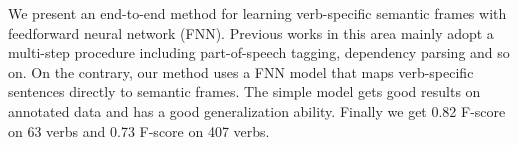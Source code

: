 We present an end-to-end method for learning verb-specific semantic frames with feedforward neural network (FNN). Previous works in this area mainly adopt a multi-step procedure including part-of-speech tagging, dependency parsing and so on. On the contrary, our method uses a FNN model that maps verb-specific sentences directly to semantic frames. The simple model gets good results on annotated data and has a good generalization ability. Finally we get 0.82 F-score on 63 verbs and 0.73 F-score on 407 verbs.
